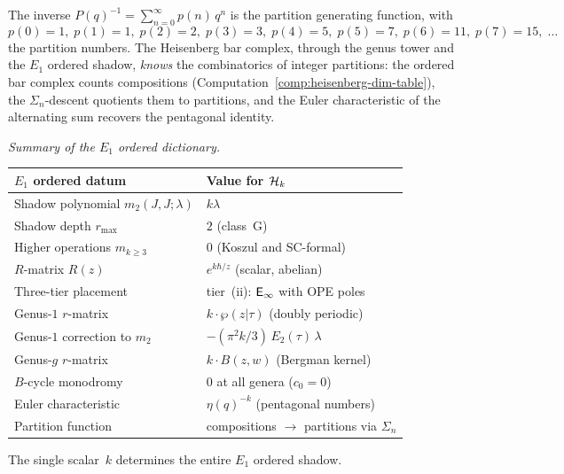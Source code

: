 \begin{computation}
The inverse $P(q)^{-1} = \sum_{n=0}^{\infty} p(n)\, q^n$ is the
partition generating function, with
\[
p(0) = 1,\;
p(1) = 1,\;
p(2) = 2,\;
p(3) = 3,\;
p(4) = 5,\;
p(5) = 7,\;
p(6) = 11,\;
p(7) = 15,\;
\ldots
\]
the partition numbers. The Heisenberg bar complex, through the genus
tower and the $E_1$ ordered shadow, \emph{knows} the combinatorics
of integer partitions: the ordered bar complex counts compositions
(Computation~\ref{comp:heisenberg-dim-table}), the $\Sigma_n$-descent
quotients them to partitions, and the Euler characteristic of the
alternating sum recovers the pentagonal identity.

\smallskip
\noindent
\emph{Summary of the $E_1$ ordered dictionary.}
\begin{center}
\small
\renewcommand{\arraystretch}{1.25}
\begin{tabular}{@{}l@{\;\;}l@{}}
\textbf{$E_1$ ordered datum} & \textbf{Value for $\mathcal{H}_k$} \\
\hline
Shadow polynomial $m_2(J,J;\lambda)$
 & $k\lambda$ \\[2pt]
Shadow depth $r_{\max}$
 & $2$ (class~G) \\[2pt]
Higher operations $m_{k \ge 3}$
 & $0$ (Koszul and SC-formal) \\[2pt]
$R$-matrix $R(z)$
 & $e^{k\hbar/z}$ (scalar, abelian) \\[2pt]
Three-tier placement
 & tier~(ii): $\mathsf{E}_{\infty}$ with OPE poles \\[2pt]
Genus-$1$ $r$-matrix
 & $k\cdot\wp(z|\tau)$ (doubly periodic) \\[2pt]
Genus-$1$ correction to $m_2$
 & $-(\pi^2 k/3)\, E_2(\tau)\, \lambda$ \\[2pt]
Genus-$g$ $r$-matrix
 & $k \cdot B(z,w)$ (Bergman kernel) \\[2pt]
$B$-cycle monodromy
 & $0$ at all genera ($c_0 = 0$) \\[2pt]
Euler characteristic
 & $\eta(q)^{-k}$ (pentagonal numbers) \\[2pt]
Partition function
 & compositions $\to$ partitions via $\Sigma_n$
\end{tabular}
\end{center}
The single scalar~$k$ determines the entire $E_1$ ordered shadow.
\end{computation}

